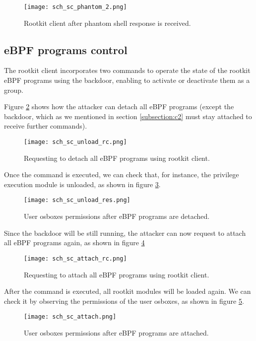 \begin{figure}[htbp]
	\centering
	\texttt{[image: sch\_sc\_phantom\_2.png]}
	\caption{Rootkit client after phantom shell response is received.}
	\label{fig:sc_phantom_2}
\end{figure}



\subsection{eBPF programs control}
The rootkit client incorporates two commands to operate the state of the rootkit eBPF programs using the backdoor, enabling to activate or deactivate them as a group.

Figure \ref{fig:sc_unload_rc} shows how the attacker can detach all eBPF programs (except the backdoor, which as we mentioned in section \ref{subsection:c2} must stay attached to receive further commands).

\begin{figure}[htbp]
	\centering
	\texttt{[image: sch\_sc\_unload\_rc.png]}
	\caption{Requesting to detach all eBPF programs using rootkit client.}
	\label{fig:sc_unload_rc}
\end{figure}

Once the command is executed, we can check that, for instance, the privilege execution module is unloaded, as shown in figure \ref{fig:sc_unload_res}.

\begin{figure}[htbp]
	\centering
	\texttt{[image: sch\_sc\_unload\_res.png]}
	\caption{User osboxes permissions after eBPF programs are detached.}
	\label{fig:sc_unload_res}
\end{figure}

Since the backdoor will be still running, the attacker can now request to attach all eBPF programs again, as shown in figure \ref{fig:sc_attach_rc}

\begin{figure}[htbp]
	\centering
	\texttt{[image: sch\_sc\_attach\_rc.png]}
	\caption{Requesting to attach all eBPF programs using rootkit client.}
	\label{fig:sc_attach_rc}
\end{figure}

After the command is executed, all rootkit modules will be loaded again. We can check it by observing the permissions of the user osboxes, as shown in figure \ref{fig:sc_attach}.

\begin{figure}[htbp]
	\centering
	\texttt{[image: sch\_sc\_attach.png]}
	\caption{User osboxes permissions after eBPF programs are attached.}
	\label{fig:sc_attach}
\end{figure}


